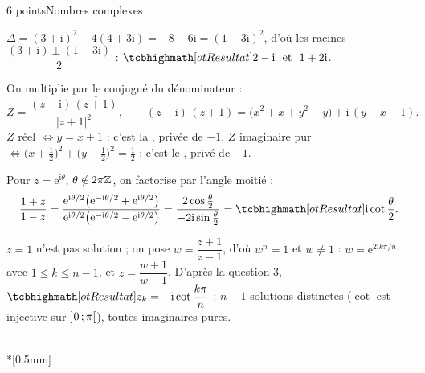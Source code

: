\begin{corrigeEval}{6 points}{Nombres complexes}
\begin{questions}
  \item $\Delta=(3+\mathrm{i})^{2}-4(4+3\mathrm{i})=-8-6\mathrm{i}=(1-3\mathrm{i})^{2}$,
    d'où les racines
    $\dfrac{(3+\mathrm{i})\pm(1-3\mathrm{i})}{2}$ :
    $\res{2-\mathrm{i}\ \text{ et }\ 1+2\mathrm{i}}$. \pts{1 pt}
  \item On multiplie par le conjugué du dénominateur :
    \[Z=\frac{(z-\mathrm{i})\,\overline{(z+1)}}{|z+1|^{2}},\qquad
      (z-\mathrm{i})\,\overline{(z+1)}=\bigl(x^{2}+x+y^{2}-y\bigr)+\mathrm{i}\,(y-x-1).\]
    $Z$ réel $\iff y=x+1$ : c'est la ,
    privée de $-1$. $Z$ imaginaire pur
    $\iff\bigl(x+\frac12\bigr)^{2}+\bigl(y-\frac12\bigr)^{2}=\frac12$ : c'est le
    , privé de $-1$.
  \item Pour $z=\mathrm{e}^{\mathrm{i}\theta}$, $\theta\notin2\pi\mathbb{Z}$, on
    factorise par l'angle moitié :
    \[\frac{1+z}{1-z}=\frac{\mathrm{e}^{\mathrm{i}\theta/2}\bigl(\mathrm{e}^{-\mathrm{i}\theta/2}+\mathrm{e}^{\mathrm{i}\theta/2}\bigr)}
      {\mathrm{e}^{\mathrm{i}\theta/2}\bigl(\mathrm{e}^{-\mathrm{i}\theta/2}-\mathrm{e}^{\mathrm{i}\theta/2}\bigr)}
      =\frac{2\cos\frac\theta2}{-2\mathrm{i}\sin\frac\theta2}
      =\res{\mathrm{i}\cot\frac\theta2}.\]
  \item $z=1$ n'est pas solution ; on pose $w=\dfrac{z+1}{z-1}$, d'où
    $w^{n}=1$ et $w\neq1$ : $w=\mathrm{e}^{2\mathrm{i}k\pi/n}$ avec
    $1\leqslant k\leqslant n-1$, et $z=\dfrac{w+1}{w-1}$. D'après la
    question 3, $\res{z_k=-\mathrm{i}\cot\dfrac{k\pi}{n}}$ : $n-1$ solutions
    distinctes ($\cot$ est injective sur $\mathopen{]}0\,{;}\,\pi\mathclose{[}$), toutes imaginaires
    pures. 
\end{questions}
\begin{center}\begin{minipage}{\linewidth}\centering
{}\\*[0.5mm]
\end{minipage}\end{center}
\end{corrigeEval}
